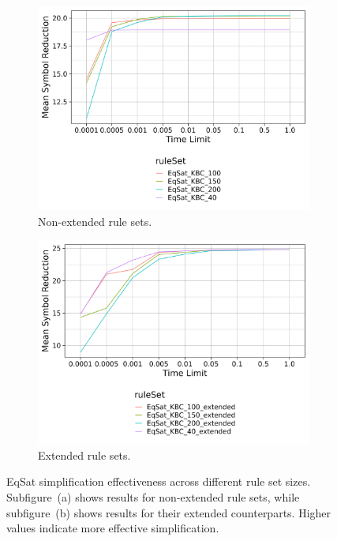\begin{figure}[h]
	\centering
	\begin{subfigure}[t]{0.48\textwidth}
		\centering
		\includegraphics[width=\linewidth]{img/by_rule_number_standard.png}
		\caption{Non-extended rule sets.}
		\label{fig:eqsat_by_rule_num_base}
	\end{subfigure}
	\hfill
	\begin{subfigure}[t]{0.48\textwidth}
		\centering
		\includegraphics[width=\linewidth]{img/by_rule_number_extended.png}
		\caption{Extended rule sets.}
		\label{fig:eqsat_by_rule_num_extended}
	\end{subfigure}
	\caption{
		EqSat simplification effectiveness across different rule set sizes.  Subfigure~(a) shows results for non-extended rule sets, while subfigure~(b) shows results for their extended counterparts.  
		Higher values indicate more effective simplification.
	}
	\label{fig:eqsat_by_rule_num}
\end{figure}

